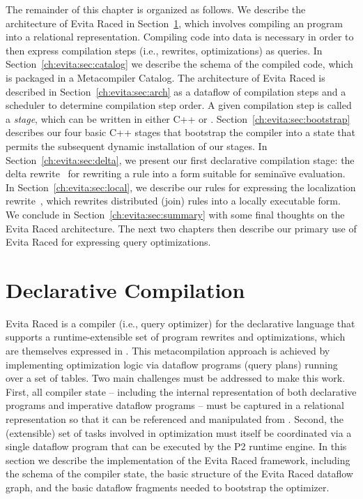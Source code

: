 The remainder of this chapter is organized as follows.  We describe the
architecture of Evita Raced in Section~\ref{ch:evita:sec:compile}, which
involves compiling an \OVERLOG program into a relational representation.
Compiling code into data is necessary in order to then express compilation
steps (i.e., rewrites, optimizations) as queries.  In
Section~\ref{ch:evita:sec:catalog} we describe the schema of the compiled code,
which is packaged in a Metacompiler Catalog.  The architecture of Evita Raced
is described in Section~\ref{ch:evita:sec:arch} as a dataflow of compilation
steps and a scheduler to determine compilation step order.  A given compilation
step is called a {\em stage}, which can be written in either C++ or \OVERLOG.
Section~\ref{ch:evita:sec:bootstrap} describes our four basic C++ stages that
bootstrap the compiler into a state that permits the subsequent dynamic
installation of our \OVERLOG stages.  In Section~\ref{ch:evita:sec:delta}, we
present our first declarative compilation stage: the delta
rewrite~\cite{loo-sigmod06} for rewriting a rule into a form suitable for
semina\"{\i}ve evaluation.  In Section~\ref{ch:evita:sec:local}, we describe our
\OVERLOG rules for expressing the localization rewrite~\cite{p2:sosp}, which
rewrites distributed (join) rules into a locally executable form.  We conclude
in Section~\ref{ch:evita:sec:summary} with some final thoughts on the Evita
Raced architecture.  The next two chapters then describe our primary use of
Evita Raced for expressing query optimizations.

\section{Declarative Compilation}
\label{ch:evita:sec:compile}

Evita Raced is a compiler (i.e., query optimizer) for the \OVERLOG declarative
language that supports a runtime-extensible set of program rewrites and
optimizations, which are themselves expressed in \OVERLOG.  This
metacompilation approach is achieved by implementing optimization logic via
dataflow programs (query plans) running over a set of tables.  Two main
challenges must be addressed to make this work.  First, all compiler state --
including the internal representation of both declarative \OVERLOG programs and
imperative dataflow programs -- must be captured in a relational representation
so that it can be referenced and manipulated from \OVERLOG.  Second, the
(extensible) set of tasks involved in optimization must itself be coordinated
via a single dataflow program that can be executed by the P2 runtime engine.
In this section we describe the implementation of the Evita Raced framework,
including the schema of the compiler state, the basic structure of the Evita
Raced dataflow graph, and the basic dataflow fragments needed to bootstrap the
optimizer.

